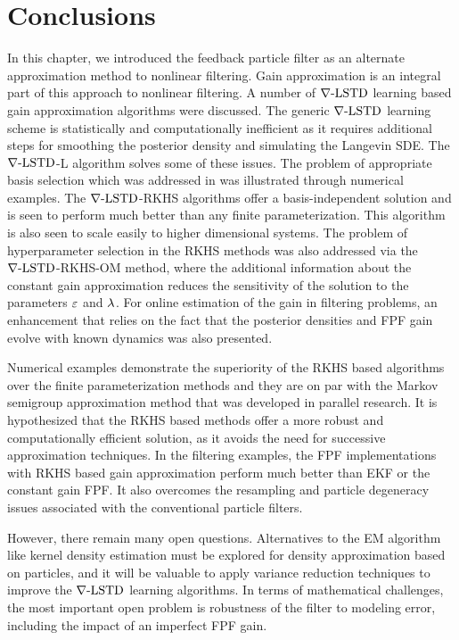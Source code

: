 \section{Conclusions}
\label{s:ch4_conclusions}
In this chapter, we introduced the feedback particle filter as an alternate approximation method to nonlinear filtering. Gain approximation is an integral part of this approach to nonlinear filtering. A number of $\nabla\text{-LSTD}$ learning based gain approximation algorithms were discussed. The generic $\nabla\text{-LSTD}$ learning scheme is statistically and computationally inefficient as it requires additional steps for smoothing the posterior density and simulating the Langevin SDE. The $\nabla\text{-LSTD}$-L algorithm solves some of these issues. The problem of appropriate basis selection which was addressed in  was illustrated through numerical examples. The $\nabla\text{-LSTD}$-RKHS algorithms offer a basis-independent solution and is seen to perform much better than any finite parameterization. This algorithm is also seen to scale easily to higher dimensional systems. The problem of hyperparameter selection in the RKHS methods was also addressed via the $\nabla\text{-LSTD}$-RKHS-OM method, where the additional information about the constant gain approximation reduces the sensitivity of the solution to the parameters $\varepsilon$ and $\lambda$. For online estimation of the gain in filtering problems, an enhancement that relies on the fact that the posterior densities and FPF gain evolve with known dynamics was also presented. 

Numerical examples demonstrate the superiority of the RKHS based algorithms over the finite parameterization methods and they are on par with the Markov semigroup approximation method that was developed in parallel research. It is hypothesized that the RKHS based methods offer a more robust and computationally efficient solution, as it avoids the need for successive approximation techniques. In the filtering examples, the FPF implementations with RKHS based gain approximation perform much better than EKF or the constant gain FPF. It also overcomes the resampling and particle degeneracy issues associated with the conventional particle filters. 

However, there remain many open questions.   Alternatives to the EM algorithm like kernel density estimation must be explored for density approximation based on particles,  and it will be valuable to apply variance reduction techniques to improve the $\nabla\text{-LSTD}$ learning algorithms. In terms of mathematical challenges, the most important open problem is robustness of the filter to modeling error, including the impact of an imperfect FPF gain.
